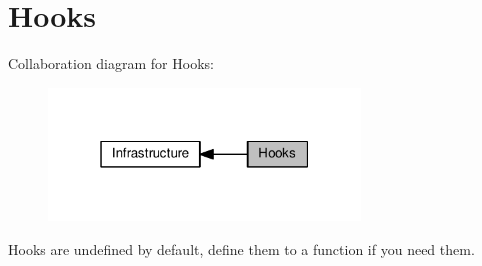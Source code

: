 \hypertarget{group__lwip__opts__hooks}{}\section{Hooks}
\label{group__lwip__opts__hooks}
Collaboration diagram for Hooks\+:
\nopagebreak
\begin{figure}[H]
\begin{center}
\leavevmode
\includegraphics[width=235pt]{group__lwip__opts__hooks}
\end{center}
\end{figure}
Hooks are undefined by default, define them to a function if you need them. 